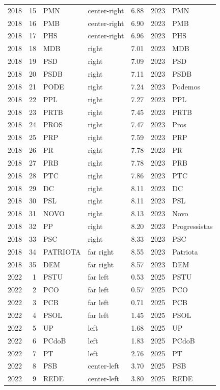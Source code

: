 \documentclass[11pt]{article}
\begin{document}
\begin{longtable}{rrlllrl}
2018 & 15 & PMN & center-right & 6.88 & 2023 & PMN \\
2018 & 16 & PMB & center-right & 6.90 & 2023 & PMB \\
2018 & 17 & PHS & center-right & 6.96 & 2023 & PHS \\
2018 & 18 & MDB & right & 7.01 & 2023 & MDB \\
2018 & 19 & PSD & right & 7.09 & 2023 & PSD \\
2018 & 20 & PSDB & right & 7.11 & 2023 & PSDB \\
2018 & 21 & PODE & right & 7.24 & 2023 & Podemos \\
2018 & 22 & PPL & right & 7.27 & 2023 & PPL \\
2018 & 23 & PRTB & right & 7.45 & 2023 & PRTB \\
2018 & 24 & PROS & right & 7.47 & 2023 & Pros \\
2018 & 25 & PRP & right & 7.59 & 2023 & PRP \\
2018 & 26 & PR & right & 7.78 & 2023 & PR \\
2018 & 27 & PRB & right & 7.78 & 2023 & PRB \\
2018 & 28 & PTC & right & 7.86 & 2023 & PTC \\
2018 & 29 & DC & right & 8.11 & 2023 & DC \\
2018 & 30 & PSL & right & 8.11 & 2023 & PSL \\
2018 & 31 & NOVO & right & 8.13 & 2023 & Novo \\
2018 & 32 & PP & right & 8.20 & 2023 & Progressistas \\
2018 & 33 & PSC & right & 8.33 & 2023 & PSC \\
2018 & 34 & PATRIOTA & far right & 8.55 & 2023 & Patriota \\
2018 & 35 & DEM & far right & 8.57 & 2023 & DEM \\
2022 & 1 & PSTU & far left & 0.53 & 2025 & PSTU \\
2022 & 2 & PCO & far left & 0.57 & 2025 & PCO \\
2022 & 3 & PCB & far left & 0.71 & 2025 & PCB \\
2022 & 4 & PSOL & far left & 1.45 & 2025 & PSOL \\
2022 & 5 & UP & left & 1.68 & 2025 & UP \\
2022 & 6 & PCdoB & left & 1.83 & 2025 & PCdoB \\
2022 & 7 & PT & left & 2.76 & 2025 & PT \\
2022 & 8 & PSB & center-left & 3.70 & 2025 & PSB \\
2022 & 9 & REDE & center-left & 3.80 & 2025 & REDE \\

\end{longtable}
\end{document}
